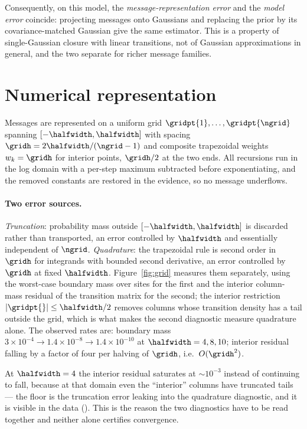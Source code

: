 Consequently, on this model, the \emph{message-representation error} and the \emph{model error}
coincide: projecting messages onto Gaussians and replacing the prior by its covariance-matched
Gaussian give the same estimator. This is a property of single-Gaussian closure with linear
transitions, not of Gaussian approximations in general, and the two separate for richer message
families.

\section{Numerical representation}
\label{app:numerics}

Messages are represented on a uniform grid $\gridpt{1},\dots,\gridpt{\ngrid}$ spanning
$[-\halfwidth,\halfwidth]$ with spacing $\gridh = 2\halfwidth/(\ngrid-1)$ and composite
trapezoidal weights $w_k = \gridh$ for interior points, $\gridh/2$ at the two ends. All
recursions run in the log domain with a per-step maximum subtracted before exponentiating, and
the removed constants are restored in the evidence, so no message underflows.

\paragraph{Two error sources.} \emph{Truncation}: probability mass outside
$[-\halfwidth,\halfwidth]$ is discarded rather than transported, an error controlled by
$\halfwidth$ and essentially independent of $\ngrid$. \emph{Quadrature}: the trapezoidal rule is
second order in $\gridh$ for integrands with bounded second derivative, an error controlled by
$\gridh$ at fixed $\halfwidth$. Figure~\ref{fig:grid} measures them separately, using the
worst-case boundary mass over sites for the first and the interior column-mass residual of the
transition matrix for the second; the interior restriction $|\gridpt{}| \le \halfwidth/2$ removes
columns whose transition density has a tail outside the grid, which is what makes the second
diagnostic measure quadrature alone. The observed rates are: boundary mass
$3\times10^{-4} \to 1.4\times10^{-8} \to 1.4\times10^{-10}$ at $\halfwidth = 4, 8, 10$; interior
residual falling by a factor of four per halving of $\gridh$, i.e.\ $O(\gridh^2)$.

At $\halfwidth=4$ the interior residual saturates at $\sim10^{-3}$ instead of continuing to fall,
because at that domain even the ``interior'' columns have truncated tails --- the floor is the
truncation error leaking into the quadrature diagnostic, and it is visible in the data
(). This is the reason the two diagnostics have to be read
together and neither alone certifies convergence.

